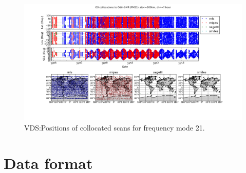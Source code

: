 \begin{figure}[t]
\centering
\includegraphics[width=17cm]{test_collocation_fm21.png}
\caption{VDS:Positions of collocated scans for frequency mode 21.}
\label{fig:vdsfm1}
\end{figure}



\section{Data format}




